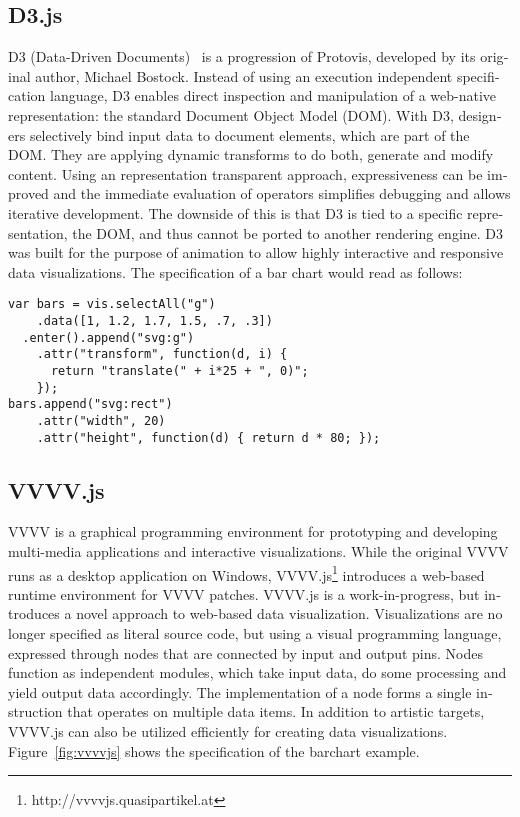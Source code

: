 \begin{english}
\subsection{D3.js}

D3 (Data-Driven Documents)~\cite{D3} is a progression of Protovis, developed by its original author, Michael Bostock. Instead of using an execution independent specification language, D3 enables direct inspection and manipulation of a web-native representation: the standard Document Object Model (DOM). With D3, designers selectively bind input data to document elements, which are part of the DOM. They are applying dynamic transforms to do both, generate and modify content. Using an representation transparent approach, expressiveness can be improved and the immediate evaluation of operators simplifies debugging and allows iterative development. The downside of this is that D3 is tied to a specific representation, the DOM, and thus cannot be ported to another rendering engine. D3 was built for the purpose of animation to allow highly interactive and responsive data visualizations. The specification of a bar chart would read as follows:

\begin{verbatim}
var bars = vis.selectAll("g")
    .data([1, 1.2, 1.7, 1.5, .7, .3])
  .enter().append("svg:g")
    .attr("transform", function(d, i) {
      return "translate(" + i*25 + ", 0)"; 
    });
bars.append("svg:rect")
    .attr("width", 20)
    .attr("height", function(d) { return d * 80; });
\end{verbatim}


\subsection{VVVV.js}

VVVV is a graphical programming environment for prototyping and developing multi-media applications and interactive visualizations. While the original VVVV runs as a desktop application on Windows, VVVV.js\footnote{http://vvvvjs.quasipartikel.at} introduces a web-based runtime environment for VVVV patches. VVVV.js is a work-in-progress, but introduces a novel approach to web-based data visualization. Visualizations are no longer specified as literal source code, but using a visual programming language, expressed through nodes that are connected by input and output pins. Nodes function as independent modules, which take input data, do some processing and yield output data accordingly. The implementation of a node forms a single instruction that operates on multiple data items. In addition to artistic targets, VVVV.js can also be utilized efficiently for creating data visualizations. Figure~\ref{fig:vvvvjs} shows the specification of the barchart example.


\end{english}

